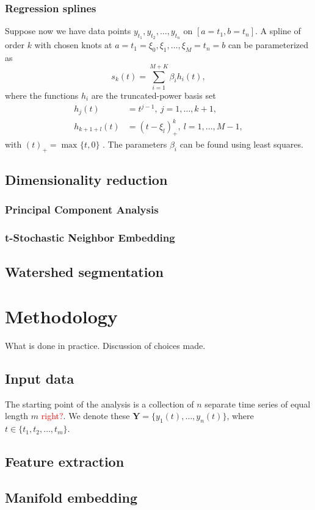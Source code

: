 \documentclass{article}
\theoremstyle{plain}
\theoremstyle{definition}
\theoremstyle{remark}
\begin{document}
\subsubsection{Regression splines}
Suppose now we have data points $y_{t_1}, y_{t_2}, \hdots, y_{t_n}$ on $[a = t_1, b = t_n]$. 
A spline of order $k$ with chosen knots at $a = t_1 = \xi_0, \xi_1, \hdots, \xi_{M} = t_n = b$ can be parameterized as 
\begin{equation*}
        s_k(t) = \sum_{i = 1}^{M + K} \beta_i h_i(t),
\end{equation*}
where the functions $h_i$ are the truncated-power basis set
\begin{align*}
        h_j(t) &= t^{j - 1}, \ j = 1, \hdots, k+1, \\
        h_{k+1+l}(t) &= (t - \xi_l)_+^k, \ l = 1, \hdots, M-1,
\end{align*}
with $(t)_+ = \max_{} \{ t, 0 \}$ \cite{hastie}.
The parameters $\beta_i$ can be found using least squares.





\subsection{Dimensionality reduction}
\subsubsection{Principal Component Analysis}
\subsubsection{t-Stochastic Neighbor Embedding}

\subsection{Watershed segmentation}

\section{Methodology}
What is done in practice.
Discussion  of choices made.
\subsection{Input data}
The starting point of the analysis is a collection of $n$ separate time series of equal length $m$ \textcolor{red}{right?}.
We denote these $\textbf{Y} = \{ y_1(t), \hdots, y_n(t) \}$, where $t \in \{ t_1, t_2, \hdots, t_m \}$.
\subsection{Feature extraction}
\subsection{Manifold embedding}








\newpage
\printbibliography
\end{document}
